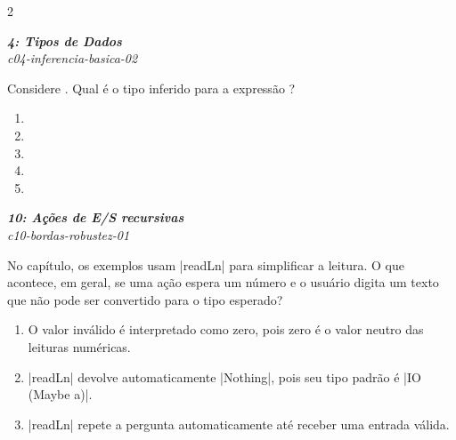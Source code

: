 \documentclass[a4paper,10pt,brazil]{article}
\begin{document}
\begin{multicols}{2}
\begin{flushright}
  \footnotesize
  \textit{\textbf{4: Tipos de Dados}}\\
  \textit{c04-inferencia-basica-02}\\

\end{flushright}
Considere . Qual é o tipo inferido para a expressão ?

\begin{enumerate}
  \item {}

  \item {}

  \item {}

  \item {}

  \item {}


\end{enumerate}

\begin{flushright}
  \footnotesize
  \textit{\textbf{10: Ações de E/S recursivas}}\\
  \textit{c10-bordas-robustez-01}\\

\end{flushright}
No capítulo, os exemplos usam \haskellinline|readLn| para simplificar a leitura. O que acontece, em geral, se uma ação espera um número e o usuário digita um texto que não pode ser convertido para o tipo esperado?

\begin{enumerate}
  \item O valor inválido é interpretado como zero, pois zero é o valor neutro das leituras numéricas.

  \item \haskellinline|readLn| devolve automaticamente \haskellinline|Nothing|, pois seu tipo padrão é \haskellinline|IO (Maybe a)|.

  \item \haskellinline|readLn| repete a pergunta automaticamente até receber uma entrada válida.


\end{enumerate}
\end{multicols}
\end{document}
